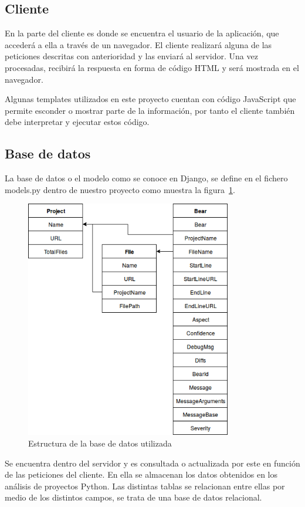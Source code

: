 \documentclass[a4paper, 12pt]{book}
\begin{document}
\subsection{Cliente}
\label{sec:seccion11.2}
En la parte del cliente es donde se encuentra el usuario de la aplicación, que accederá a ella a través de un navegador. El cliente realizará alguna de las peticiones descritas con anterioridad y las enviará al servidor. Una vez procesadas, recibirá la respuesta en forma de código HTML y será mostrada en el navegador.

Algunas templates utilizados en este proyecto cuentan con código JavaScript que permite esconder o mostrar parte de la información, por tanto el cliente también debe interpretar y ejecutar estos código.

\subsection{Base de datos}
\label{sec:seccion11.3}
La base de datos o el modelo como se conoce en Django, se define en el fichero models.py dentro de nuestro proyecto como muestra la figura~\ref{fig:EstructuraBBDD}.
\begin{figure}[H]
  \centering
  \includegraphics[width=9cm, keepaspectratio]{img/EstructuraBBDD}
  \caption{Estructura de la base de datos utilizada}
  \label{fig:EstructuraBBDD}
\end{figure}
Se encuentra dentro del servidor y es consultada o actualizada por este en función de las peticiones del cliente. En ella se almacenan los datos obtenidos en los análisis de proyectos Python. Las distintas tablas se relacionan entre ellas por medio de los distintos campos, se trata de una base de datos relacional.
\end{document}

